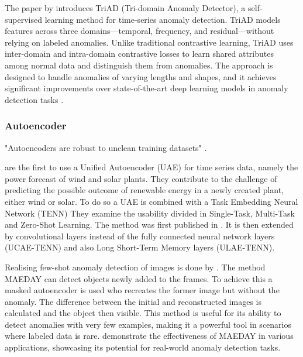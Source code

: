 The paper by  introduces TriAD (Tri-domain Anomaly Detector), a self-supervised learning method for time-series anomaly detection. TriAD models features across three domains—temporal, frequency, and residual—without relying on labeled anomalies. Unlike traditional contrastive learning, TriAD uses inter-domain and intra-domain contrastive losses to learn shared attributes among normal data and distinguish them from anomalies. The approach is designed to handle anomalies of varying lengths and shapes, and it achieves significant improvements over state-of-the-art deep learning models in anomaly detection tasks .



\subsubsection{Autoencoder}
"Autoencoders are robust to unclean training datasets" .

 are the first to use a Unified Autoencoder (UAE) for time series data, namely the power forecast of wind and solar plants. They contribute to the challenge of predicting the possible outcome of renewable energy in a newly created plant, either wind or solar. To do so a UAE is combined with a Task Embedding Neural Network (TENN) They examine the usability divided in Single-Task, Multi-Task and Zero-Shot Learning. The method was first published in . It is then extended by convolutional layers instead of the fully connected neural network layers (UCAE-TENN) and also Long Short-Term Memory layers (ULAE-TENN).

Realising few-shot anomaly detection of images is done by . The method MAEDAY can detect objects newly added to the frames. To achieve this a masked autoencoder is used who recreates the former image but without the anomaly. The difference between the initial and reconstructed images is calculated and the object then visible.
This method is useful for its ability to detect anomalies with very few examples, making it a powerful tool in scenarios where labeled data is rare.  demonstrate the effectiveness of MAEDAY in various applications, showcasing its potential for real-world anomaly detection tasks.

